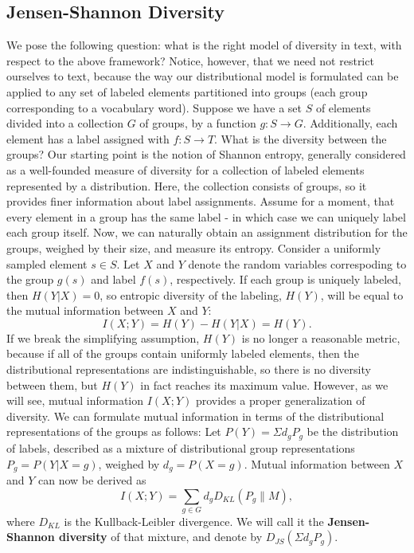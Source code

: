 \subsection{Jensen-Shannon Diversity}
\label{sec:jensen-shannon-divergence}
We pose the following question: what is the right model of diversity
in text, with respect to the above framework? Notice, however, that we
need not restrict ourselves to text, because the way our
distributional model is formulated can be applied to any set of
labeled elements partitioned into groups (each group corresponding to
a vocabulary word). Suppose we have a set $S$ of elements divided into
a collection $G$ of groups, by a function $g:S\rightarrow
G$. Additionally, each element has a label assigned with
$f:S\rightarrow T$. What is the diversity between the groups? Our
starting point is the notion of Shannon 
entropy, generally considered as a well-founded measure of diversity 
for a collection of labeled elements represented by a
distribution. Here, the collection consists of groups, so it provides
finer information about label assignments. Assume for a moment, that
every element in a group has the same label - in which case we can
uniquely label each group itself. Now, we can naturally obtain an
assignment distribution for the groups, weighed by their size, and
measure its entropy. Consider a uniformly sampled element $s\in
S$. Let $X$ and $Y$ denote the random variables correspoding to the
group $g(s)$ and label $f(s)$, respectively. If each group is uniquely
labeled, then $H(Y|X)=0$, so entropic diversity of the
labeling, $H(Y)$, will be equal to the mutual information between $X$
and $Y$: 
\[I(X;Y) = H(Y) - H(Y|X) =H(Y).\]
If we break the simplifying assumption, $H(Y)$ is no longer a
reasonable metric, because if all of the groups contain uniformly
labeled elements, then the distributional representations are
indistinguishable, so there is no diversity between them, but $H(Y)$
in fact reaches its maximum value. However, as we will see, mutual
information $I(X;Y)$ provides a proper generalization of diversity. We
can formulate mutual information in terms of the distributional
representations of the groups as follows:
\bep\label{mixture}
Let $P(Y)=\Sigma d_g P_g$ be the distribution of labels,
described as a mixture of distributional group representations
$P_g=P(Y|X=g)$, weighed by $d_g=P(X=g)$. Mutual information between
$X$ and $Y$ can now be derived as
\[ I(X;Y)= \sum_{g\in G} d_g D_{KL}(P_g\|M),\]
where $D_{KL}$ is the Kullback-Leibler divergence.
We will call it the {\bf Jensen-Shannon diversity} of that
mixture, and denote by $D_{JS}(\Sigma d_gP_g)$.
\eep

